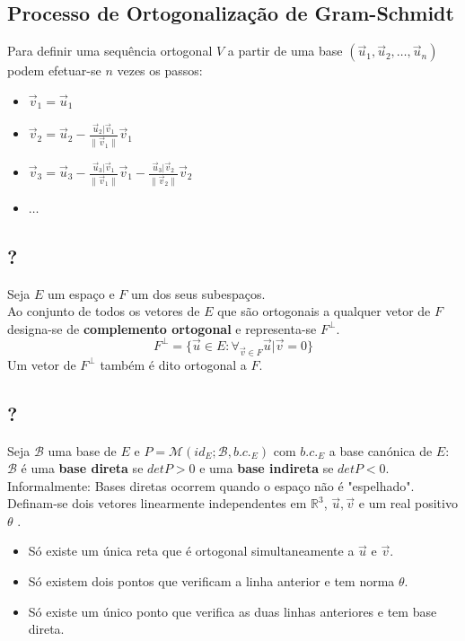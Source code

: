 \documentclass[]{report}
\begin{document}
\subsection{Processo de Ortogonalização de Gram-Schmidt}
Para definir uma sequência ortogonal $V$ a partir de uma base $(\vec u_1, \vec u_2, \dots, \vec u_n)$ podem efetuar-se $n$ vezes os passos:
\begin{itemize}
\item $\vec v_1 = \vec u_1$
\item $\vec v_2 = \vec u_2 - \frac{\vec u_2 | \vec v_1}{ \parallel \vec v_1 \parallel } \vec v_1$
\item $\vec v_3 = \vec u_3 - \frac{\vec  u_3 | \vec  v_1}{\parallel \vec  v_1 \parallel} \vec  v_1 - \frac{ \vec u_3 | \vec  v_2}{\parallel \vec  v_2 \parallel} \vec v_2$
\item $\dots$
\end{itemize}
\subsection{?}
Seja $E$ um espaço e $F$ um dos seus subespaços.\\
Ao conjunto de todos os vetores de $E$ que são ortogonais a qualquer vetor de $F$ designa-se de \textbf{complemento ortogonal} e representa-se $F^{\perp}$.
$$F^{\perp} = \{\vec u \in E: \forall_{\vec v \in F} \vec u | \vec v = 0\}$$
Um vetor de $F^{\perp}$ também é dito ortogonal a $F$.
\subsection{?}
Seja $\mathcal{B}$ uma base de $E$ e $P = \mathcal{M}(id_E; \mathcal{B}, b.c._E)$ com $b.c._E$ a base canónica de $E$:\\
\indent $\mathcal{B}$ é uma \textbf{base direta} se  $det P > 0$ e uma \textbf{base indireta} se $det P < 0$.\\
Informalmente: Bases diretas ocorrem quando o espaço não é "espelhado".\\[2mm]
Definam-se dois vetores linearmente independentes em $\mathbb{R}^3$, $\vec u, \vec v$ e um real positivo $\theta$ .
\begin{itemize}
\item Só existe um única reta que é ortogonal simultaneamente a $\vec u$ e $\vec v$.
\item Só existem dois pontos que verificam a linha anterior e tem norma $\theta$.
\item Só existe um único ponto que verifica as duas linhas anteriores e tem base direta.
\end{itemize}
\clearpage
\end{document}
